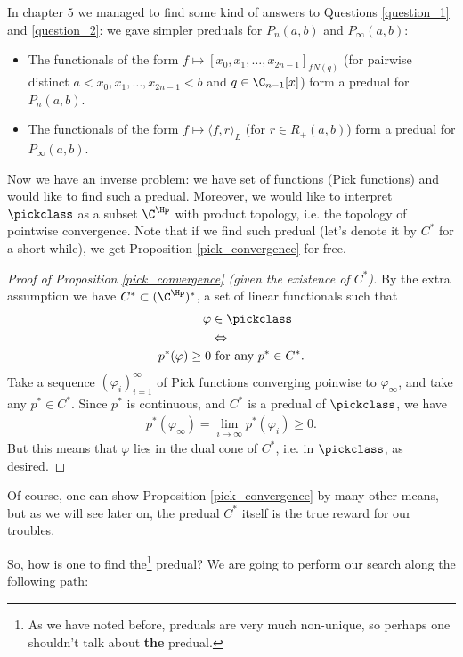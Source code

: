 In chapter $5$ we managed to find some kind of answers to Questions \ref{question_1} and \ref{question_2}: we gave simpler preduals for $P_{n}(a, b)$ and $P_{\infty}(a, b)$:

\begin{itemize}
	\item The functionals of the form $f \mapsto [x_{0}, x_{1}, \ldots, x_{2 n - 1}]_{f N(q)}$ (for pairwise distinct $a < x_{0}, x_{1}, \ldots, x_{2 n - 1} < b$ and $q \in \C_{n - 1}[x]$) form a predual for $P_{n}(a, b)$.
	\item The functionals of the form $f \mapsto \langle f, r \rangle_{L}$ (for $r \in R_{+}(a, b)$) form a predual for $P_{\infty}(a, b)$.
\end{itemize}

Now we have an inverse problem: we have set of functions (Pick functions) and would like to find such a predual. Moreover, we would like to interpret $\pickclass$ as a subset $\C^{\Hp}$ with product topology, i.e. the topology of pointwise convergence. Note that if we find such predual (let's denote it by $C^{*}$ for a short while), we get Proposition \ref{pick_convergence} for free.

\begin{proof}[Proof of Proposition \ref{pick_convergence} (given the existence of $C^{*}$)]
	By the extra assumption we have $C^{*} \subset (\C^{\Hp})^{*}$, a set of linear functionals such that
	\begin{align*}
		\varphi &\in \pickclass \\
		&\Leftrightarrow \\
		p^{*}(\varphi) \geq 0 &\text{ for any $p^{*} \in C^{*}$}.
	\end{align*}
	Take a sequence $(\varphi_{i})_{i = 1}^{\infty}$ of Pick functions converging poinwise to $\varphi_{\infty}$, and take any $p^{*} \in C^{*}$. Since $p^{*}$ is continuous, and $C^{*}$ is a predual of $\pickclass$, we have
	\begin{align*}
		p^{*}(\varphi_{\infty}) = \lim_{i \to \infty} p^{*}(\varphi_{i}) \geq 0.
	\end{align*}
	But this means that $\varphi$ lies in the dual cone of $C^{*}$, i.e. in $\pickclass$, as desired.
\end{proof}

Of course, one can show Proposition \ref{pick_convergence} by many other means, but as we will see later on, the predual $C^{*}$ itself is the true reward for our troubles.

So, how is one to find the\footnote{As we have noted before, preduals are very much non-unique, so perhaps one shouldn't talk about \textbf{the} predual.} predual? We are going to perform our search along the following path:

